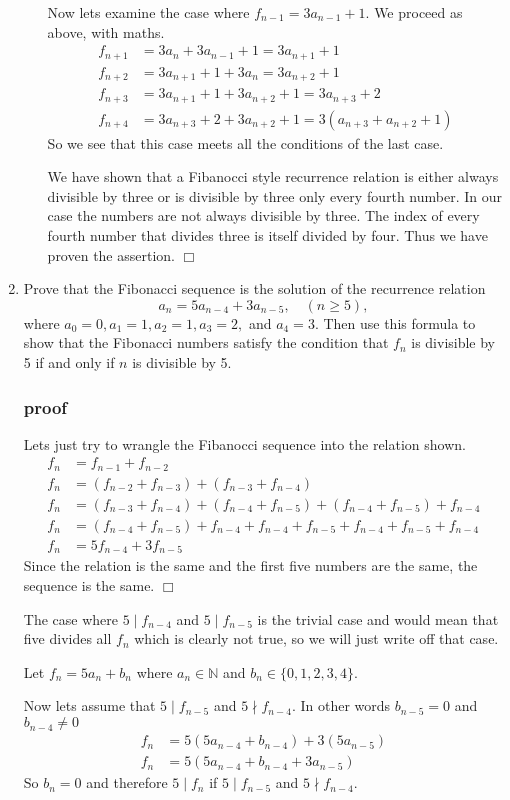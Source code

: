\documentclass{article}
\begin{document}
\begin{enumerate}
\begin{enumerate}
Now lets examine the case where $f_{n-1}=3a_{n-1}+1$. We proceed as above, with maths.
\begin{align*}
  f_{n+1}&=3a_n+3a_{n-1}+1=3a_{n+1}+1\\
  f_{n+2}&=3a_{n+1}+1+3a_{n}=3a_{n+2}+1\\
  f_{n+3}&=3a_{n+1}+1+3a_{n+2}+1=3a_{n+3}+2\\
  f_{n+4}&=3a_{n+3}+2+3a_{n+2}+1=3(a_{n+3}+a_{n+2}+1)
\end{align*}
So we see that this case meets all the conditions of the last case.

We have shown that a Fibanocci style recurrence relation is either always divisible by three or is divisible by three only every fourth number. In our case the numbers are not always divisible by three. The index of every fourth number that divides three is itself divided by four. Thus we have proven the assertion. $\Box$
\end{enumerate}
\item
Prove that the Fibonacci sequence is the solution of the recurrence relation
\[a_n=5a_{n-4}+3a_{n-5},\quad(n\ge5),\]
where $a_0=0,a_1=1,a_2=1,a_3=2,$ and $a_4=3$. Then use this formula to show that the Fibonacci numbers satisfy the condition that $f_n$ is divisible by 5 if and only if $n$ is divisible by 5.
\subsubsection*{proof}
Lets just try to wrangle the Fibanocci sequence into the relation shown.
\begin{align*}
  f_n&=f_{n-1}+f_{n-2}\\
  f_n&=(f_{n-2}+f_{n-3})+(f_{n-3}+f_{n-4})\\
  f_n&=(f_{n-3}+f_{n-4})+(f_{n-4}+f_{n-5})+(f_{n-4}+f_{n-5})+f_{n-4}\\
  f_n&=(f_{n-4}+f_{n-5})+f_{n-4}+f_{n-4}+f_{n-5}+f_{n-4}+f_{n-5}+f_{n-4}\\
  f_n&=5f_{n-4}+3f_{n-5}
\end{align*}
Since the relation is the same and the first five numbers are the same, the sequence is the same. $\Box$

The case where $5\mid f_{n-4}$ and $5\mid f_{n-5}$ is the trivial case and would mean that five divides all $f_n$ which is clearly not true, so we will just write off that case.

Let $f_n=5a_n+b_n$ where $a_n\in\mathbb{N}$ and $b_n\in\{0,1,2,3,4\}$.

Now lets assume that $5\mid f_{n-5}$ and $5\nmid f_{n-4}$. In other words $b_{n-5}=0$ and $b_{n-4}\ne0$
\begin{align*}
  f_n&=5(5a_{n-4}+b_{n-4})+3(5a_{n-5})\\
  f_n&=5(5a_{n-4}+b_{n-4}+3a_{n-5})
\end{align*}
So $b_n=0$ and therefore $5\mid f_n$ if $5\mid f_{n-5}$ and $5\nmid f_{n-4}$.


\end{enumerate}
\end{document}
